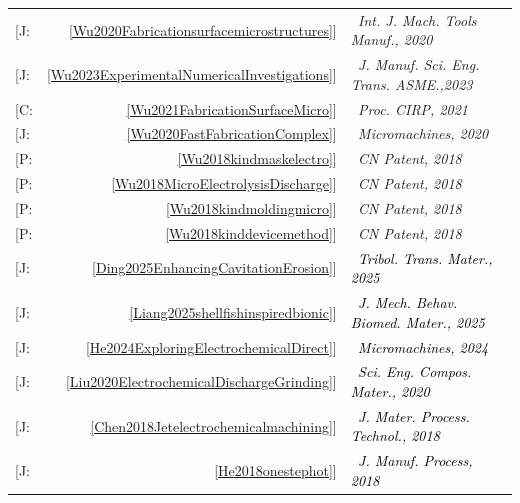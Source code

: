 \documentclass{myCitation}
\begin{document}
\title { }
\date{}
\author{ }





\nocite{*}
\bfseries
\color{RoyalBlue4}
\setlength{\tabcolsep}{0pt}
\begin{tabular}{lrl}
        {[J:} & {\ref{Wu2020Fabricationsurfacemicrostructures}]}   & \textit{\textcolor{citeRed}{\, Int. J. Mach. Tools Manuf., 2020}}      \\
        {[J:} & {\ref{Wu2023ExperimentalNumericalInvestigations}]} & \textit{\textcolor{citeRed}{\, J. Manuf. Sci. Eng. Trans. ASME.,2023}} \\
        {[C:} & {\ref{Wu2021FabricationSurfaceMicro}]}             & \textit{\textcolor{citeRed}{\, Proc. CIRP, 2021}}                      \\
        {[J:} & {\ref{Wu2020FastFabricationComplex}]}              & \textit{\textcolor{citeRed}{\, Micromachines, 2020}}                   \\
        {[P:} & {\ref{Wu2018kindmaskelectro}]}                     & \textit{\textcolor{citeRed}{\, CN Patent, 2018}}                       \\
        {[P:} & {\ref{Wu2018MicroElectrolysisDischarge}]}          & \textit{\textcolor{citeRed}{\, CN Patent, 2018}}                       \\
        {[P:} & {\ref{Wu2018kindmoldingmicro}]}                    & \textit{\textcolor{citeRed}{\, CN Patent, 2018}}                       \\
        {[P:} & {\ref{Wu2018kinddevicemethod}]}                    & \textit{\textcolor{citeRed}{\, CN Patent, 2018}}                       \\
        {[J:} & {\ref{Ding2025EnhancingCavitationErosion}]}        & \textit{\textcolor{black}{\, Tribol. Trans. Mater., 2025}}             \\
        {[J:} & {\ref{Liang2025shellfishinspiredbionic}]}          & \textit{\textcolor{black}{\, J. Mech. Behav. Biomed. Mater., 2025}}    \\
        {[J:} & {\ref{He2024ExploringElectrochemicalDirect}]}      & \textit{\textcolor{black}{\, Micromachines, 2024}}                     \\
        {[J:} & {\ref{Liu2020ElectrochemicalDischargeGrinding}]}   & \textit{\textcolor{black}{\, Sci. Eng. Compos. Mater., 2020}}          \\
        {[J:} & {\ref{Chen2018Jetelectrochemicalmachining}]}       & \textit{\textcolor{black}{\, J. Mater. Process. Technol., 2018}}       \\
        {[J:} & {\ref{He2018onestephot}]}                          & \textit{\textcolor{black}{\, J. Manuf. Process, 2018}}                 \\
\end{tabular}
\end{document}

